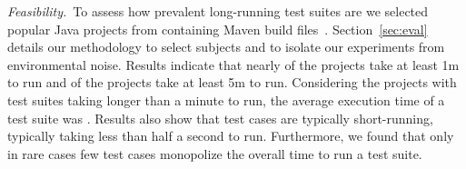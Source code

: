 




\noindent\emph{Feasibility.}~To assess how prevalent
long-running test suites are we selected \numSubjs{} popular Java
projects from \github{} containing Maven build files~\cite{maven}.
Section~\ref{sec:eval} details our methodology to select subjects and
to isolate our experiments from environmental noise.  Results indicate
that nearly \percentMedLongRunning{} of the projects take at least 1m
to run and \percentLongRunning{} of the projects
take at least 5m to run.  Considering the \numMedLong{}
projects with test suites taking longer than a minute to run, the average execution time of a test
suite was \averageMedLongRunning{}.  Results also show that test cases
are typically short-running, typically taking less than half a second
to run.  Furthermore, we found that only in rare cases few test cases
monopolize the overall time to run a test suite.


